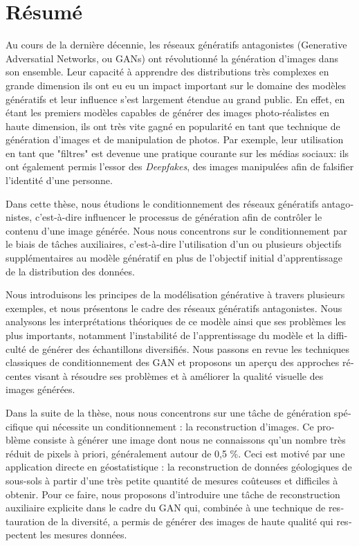 \chapter*{Résumé}
\label{chap:resume}

\begin{otherlanguage}{french}
Au cours de la dernière décennie, les réseaux génératifs antagonistes (Generative Adversatial Networks, ou \ac{GAN}s) ont révolutionné la génération d'images dans son ensemble. Leur capacité à apprendre des distributions très complexes en grande dimension ils ont eu eu un impact important sur le domaine des modèles génératifs et leur influence s'est largement étendue au grand public. En effet, en étant les premiers modèles capables de générer des images photo-réalistes en haute dimension, ils ont très vite gagné en popularité en tant que technique de génération d'images et de manipulation de photos. Par exemple, leur utilisation en tant que "filtres" est devenue une pratique courante sur les médias sociaux: ils ont également permis l'essor des \textit{Deepfakes}, des images manipulées afin de falsifier l'identité d'une personne. 

Dans cette thèse, nous étudions le conditionnement des réseaux génératifs antagonistes, c'est-à-dire influencer le processus de génération afin de contrôler le contenu d'une image générée. Nous nous concentrons sur le conditionnement par le biais de tâches auxiliaires, c'est-à-dire l'utilisation d'un ou plusieurs objectifs supplémentaires au modèle génératif en plus de l'objectif initial d'apprentissage de la distribution des données.

Nous introduisons les principes de la modélisation générative à travers plusieurs  exemples, et nous présentons le cadre des réseaux génératifs antagonistes. Nous analysons les interprétations théoriques de ce modèle ainsi que ses problèmes les plus importants, notamment l'instabilité de l'apprentissage du modèle et la difficulté de générer des échantillons diversifiés. Nous passons en revue les techniques classiques de conditionnement des GAN et proposons un aperçu des approches récentes visant à résoudre ses problèmes et à améliorer la qualité visuelle des images générées.

Dans la suite de la thèse, nous nous concentrons sur une tâche de génération spécifique qui nécessite un conditionnement : la reconstruction d'images. Ce problème consiste à générer une image dont nous ne connaissons qu'un nombre très réduit de pixels à priori, généralement autour de 0,5 \%. Ceci est motivé par une application directe en géostatistique : la reconstruction de données géologiques de sous-sols à partir d'une très petite quantité de mesures coûteuses et difficiles à obtenir. Pour ce faire, nous proposons d'introduire une tâche de reconstruction auxiliaire explicite dans le cadre du GAN qui, combinée à une technique de restauration de la diversité, a permis de générer des images de haute qualité qui respectent les mesures données.


\end{otherlanguage}
